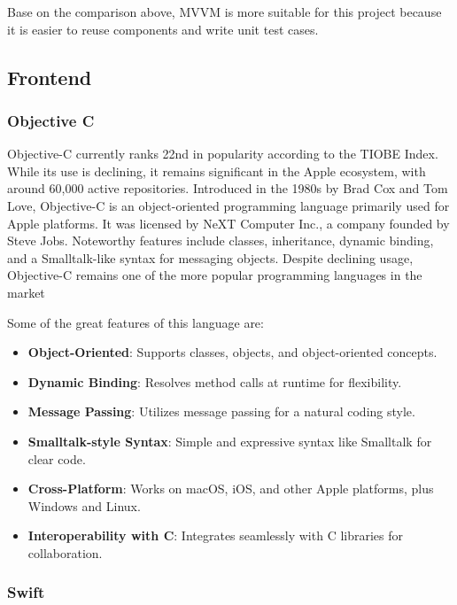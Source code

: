 Base on the comparison above, MVVM is more suitable for this project because it is easier to reuse components and write unit test cases.

\subsection{Frontend}

\subsubsection{Objective C}

Objective-C currently ranks 22nd in popularity according to the TIOBE Index. While its use is declining, it remains significant in the Apple ecosystem, with around 60,000 active repositories. Introduced in the 1980s by Brad Cox and Tom Love, Objective-C is an object-oriented programming language primarily used for Apple platforms. It was licensed by NeXT Computer Inc., a company founded by Steve Jobs. Noteworthy features include classes, inheritance, dynamic binding, and a Smalltalk-like syntax for messaging objects. Despite declining usage, Objective-C remains one of the more popular programming languages in the market

Some of the great features of this language are:

\begin{itemize}
    \item \textbf{Object-Oriented}: Supports classes, objects, and object-oriented concepts.
    \item \textbf{Dynamic Binding}: Resolves method calls at runtime for flexibility.
    \item \textbf{Message Passing}: Utilizes message passing for a natural coding style.
    \item \textbf{Smalltalk-style Syntax}: Simple and expressive syntax like Smalltalk for clear code.
    \item \textbf{Cross-Platform}: Works on macOS, iOS, and other Apple platforms, plus Windows and Linux.
    \item \textbf{Interoperability with C}: Integrates seamlessly with C libraries for collaboration.
\end{itemize}

\subsubsection{Swift}

